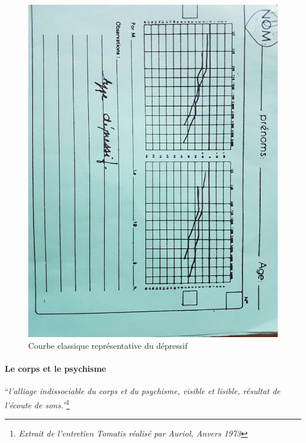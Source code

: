  

  \begin{figure}
	\centering
	\includegraphics[width=0.7\linewidth]{images/courbedepressif.jpg}
	\caption[Exemple d'une courbe de dépressif]{Courbe classique représentative du dépressif}
       
	\label{groupecontroleimage1}
\end{figure}







\paragraph{Le corps et le psychisme}

``\emph{l'alliage indissociable du corps et du psychisme, 
visible et lisible, résultat de l'écoute de sons.''}\footnote{\emph{Extrait de l'entretien Tomatis réalisé par Auriol, Anvers 1973}}

